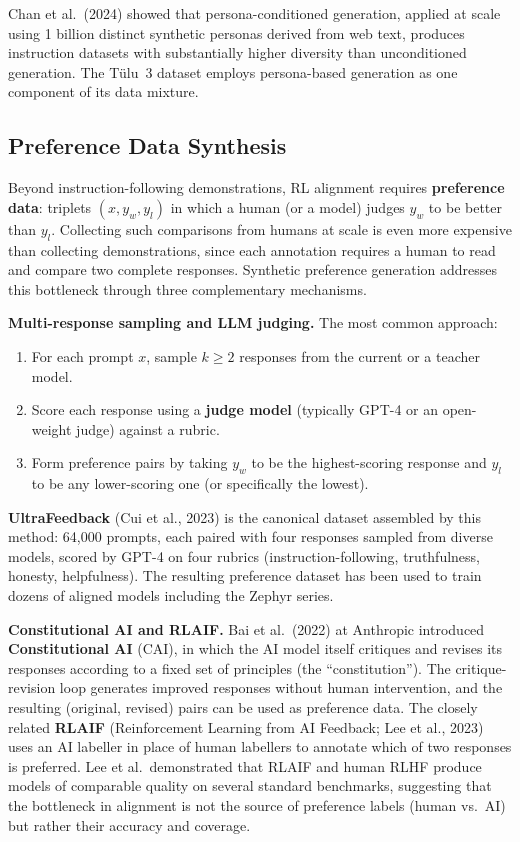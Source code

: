 Chan et al.\ (2024) showed that persona-conditioned generation, applied at scale using 1 billion distinct synthetic personas derived from web text, produces instruction datasets with substantially higher diversity than unconditioned generation. The T\"{u}lu~3 dataset employs persona-based generation as one component of its data mixture.

\subsection{Preference Data Synthesis}

Beyond instruction-following demonstrations, RL alignment requires \textbf{preference data}: triplets $(x, y_w, y_l)$ in which a human (or a model) judges $y_w$ to be better than $y_l$. Collecting such comparisons from humans at scale is even more expensive than collecting demonstrations, since each annotation requires a human to read and compare two complete responses. Synthetic preference generation addresses this bottleneck through three complementary mechanisms.

\textbf{Multi-response sampling and LLM judging.} The most common approach:
\begin{enumerate}[leftmargin=*]
  \item For each prompt $x$, sample $k \geq 2$ responses from the current or a teacher model.
  \item Score each response using a \textbf{judge model} (typically GPT-4 or an open-weight judge) against a rubric.
  \item Form preference pairs by taking $y_w$ to be the highest-scoring response and $y_l$ to be any lower-scoring one (or specifically the lowest).
\end{enumerate}

\textbf{UltraFeedback} (Cui et al., 2023) is the canonical dataset assembled by this method: 64{,}000 prompts, each paired with four responses sampled from diverse models, scored by GPT-4 on four rubrics (instruction-following, truthfulness, honesty, helpfulness). The resulting preference dataset has been used to train dozens of aligned models including the Zephyr series.

\textbf{Constitutional AI and RLAIF.} Bai et al.\ (2022) at Anthropic introduced \textbf{Constitutional AI} (CAI), in which the AI model itself critiques and revises its responses according to a fixed set of principles (the ``constitution''). The critique-revision loop generates improved responses without human intervention, and the resulting (original, revised) pairs can be used as preference data. The closely related \textbf{RLAIF} (Reinforcement Learning from AI Feedback; Lee et al., 2023) uses an AI labeller in place of human labellers to annotate which of two responses is preferred. Lee et al.\ demonstrated that RLAIF and human RLHF produce models of comparable quality on several standard benchmarks, suggesting that the bottleneck in alignment is not the source of preference labels (human vs.\ AI) but rather their accuracy and coverage.


